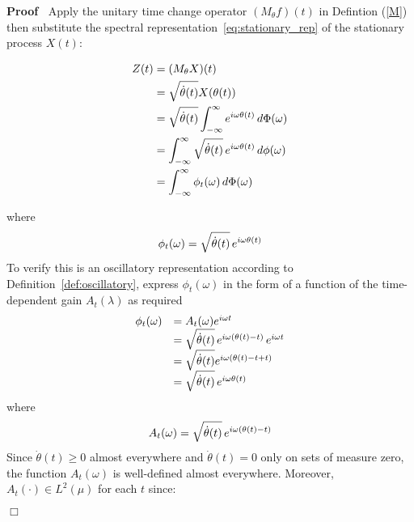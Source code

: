 \documentclass{article}
\newcommand{\cdummy}{\cdot}
\newenvironment{proof}{\noindent\textbf{Proof\ }}{\hspace*{\fill}$\Box$\medskip}
\begin{document}
\begin{proof}
  Apply the unitary time change operator $(M_{\theta} f) (t)$ in Defintion
  (\ref{M}) then substitute the spectral
  representation~\eqref{eq:stationary_rep} of the stationary process $X (t)$:
  
  \begin{align}
    Z (t) & = (M_{\theta} X) (t) \nonumber\\
    & = \sqrt{\dot{\theta} (t)} X (\theta (t)) \\
    & = \sqrt{\dot{\theta} (t)}  \int_{- \infty}^{\infty} e^{i \omega \theta
    (t)}  \hspace{0.17em} d \Phi (\omega) \\
    & = \int_{- \infty}^{\infty} \sqrt{\dot{\theta} (t)}  \hspace{0.17em}
    e^{i \omega \theta (t)}  \hspace{0.17em} d \phi (\omega) \\
    & = \int_{- \infty}^{\infty} \phi_t (\omega)  \hspace{0.17em} d \Phi
    (\omega) 
  \end{align}
  
  where
  \begin{equation}
    \phi_t (\omega) = \sqrt{\dot{\theta} (t)}  \hspace{0.17em} e^{i \omega
    \theta (t)}
  \end{equation}
  To verify this is an oscillatory representation according to
  Definition~\ref{def:oscillatory}, express $\phi_t (\omega)$ in the form of a
  function of the time-dependent gain $A_t (\lambda)$ as required
  \begin{equation}
    \begin{array}{ll}
      \phi_t (\omega) & = A_t (\omega) e^{i \omega t}\\
      & = \sqrt{\dot{\theta} (t)}  \hspace{0.17em} e^{i \omega (\theta (t) -
      t)}  \hspace{0.17em} e^{i \omega t}\\
      & = \sqrt{\dot{\theta} (t)} e^{i \omega (\theta (t) - t + t)}\\
      & = \sqrt{\dot{\theta} (t)}  \hspace{0.17em} e^{i \omega \theta (t)}
    \end{array}
  \end{equation}
  where
  \begin{equation}
    A_t (\omega) = \sqrt{\dot{\theta} (t)}  \hspace{0.17em} e^{i \omega
    (\theta (t) - t)}
  \end{equation}
  Since $\dot{\theta} (t) \geq 0$ almost everywhere and $\dot{\theta} (t) = 0$
  only on sets of measure zero, the function $A_t (\omega)$ is well-defined
  almost everywhere. Moreover, $A_t (\cdummy) \in L^2 (\mu)$ for each $t$
  since:
  

\end{proof}
\end{document}
